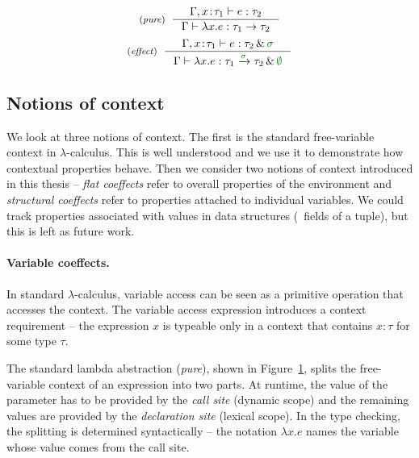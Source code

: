 
\begin{figure}
\begin{equation*}
\tyrule{pure}
  { \Gamma, x\!:\!\tau_1 \vdash e : \tau_2}
  { \Gamma \vdash \lambda x.e : \tau_1 \rightarrow \tau_2}
\end{equation*}
\begin{equation*}
\tyrule{effect}
  { \Gamma, x\!:\!\tau_1 \vdash e : \tau_2 \,\&\, \cclrd{\sigma} }
  { \Gamma \vdash \lambda x.e : \tau_1 \xrightarrow{\cclrd{\sigma}} \tau_2 \,\&\, \cclrd{\emptyset} }
\end{equation*}

\label{fig:applications-abs}
\end{figure}


\subsection{Notions of context}

We look at three notions of context. The first is the standard free-variable context in 
$\lambda$-calculus. This is well understood and we use it to demonstrate how contextual 
properties behave. Then we consider two notions of context introduced in this thesis --
\emph{flat coeffects} refer to overall properties of the environment and \emph{structural coeffects} 
refer to properties attached to individual variables. We could track properties associated
with values in data structures (\eg~fields of a tuple), but this is left as future work.

\paragraph{Variable coeffects.}

In standard $\lambda$-calculus, variable access can be seen as a primitive operation that 
accesses the context. The variable access expression introduces a context requirement -- the 
expression $x$ is typeable only in a context that contains $x:\tau$ for some type $\tau$. 

The standard lambda abstraction (\emph{pure}), shown in Figure~\ref{fig:applications-abs},
splits the free-variable context of an expression into two parts. At runtime, the value of the parameter
has to be provided by the \emph{call site} (dynamic scope) and the remaining values are provided 
by the \emph{declaration site} (lexical scope). In the type checking, the splitting is determined 
syntactically -- the notation $\lambda x.e$ names the variable whose value comes from the call site.

